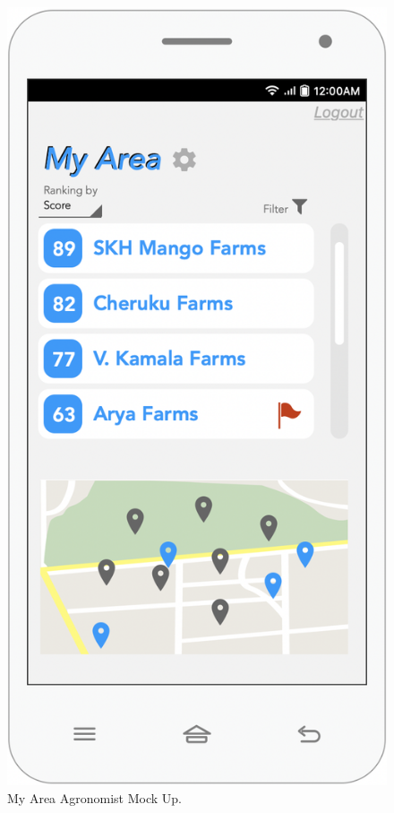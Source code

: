 \begin{multicols}{3}
 
\begin{figure}[H]
 \centering
\includegraphics[scale=0.35]{../images_diagrams/mock_ups/myarea100.png}
\caption{\label{fig:mock_area}My Area Agronomist Mock Up.}
 \end{figure}
 

\end{multicols}
